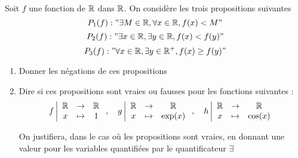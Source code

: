 \documentclass[a4paper, 11pt]{article}
\begin{document}
\begin{exercice}
Soit $f$ une fonction de $\mathbb{R}$ dans $\mathbb{R}$. On considère les trois propositions suivantes 
$$P_1(f) : "\exists M\in \mathbb{R}, \forall x \in \mathbb{R}, f(x) <M"$$
$$P_2(f) : "\exists x\in \mathbb{R}, \exists y \in \mathbb{R}, f(x) <f(y)"$$
$$P_3(f) : "\forall x\in \mathbb{R}, \exists y \in \mathbb{R}^+, f(x) \geq f(y)"$$

\begin{enumerate}
    \item Donner les négations de ces propositions
    \item Dire si ces propositions sont vraies ou fausses pour les fonctions suivantes :
    $$ f \left| \begin{array}{ccc}
         \mathbb{R} &\rightarrow &\mathbb{R}   \\
         x & \mapsto & 1
    \end{array}\right. ,\quad  g \left| \begin{array}{ccc}
         \mathbb{R} &\rightarrow &\mathbb{R}   \\
         x & \mapsto & \exp(x)
    \end{array}\right. ,\quad  h \left| \begin{array}{ccc}
         \mathbb{R} &\rightarrow &\mathbb{R}   \\
         x & \mapsto & \cos(x)
    \end{array}\right.$$

On justifiera, dans le cas où les propositions sont vraies, en donnant une valeur pour les variables quantifiées par le quantificateur $\exists$
    
\end{enumerate}
\end{exercice}
\end{document}
